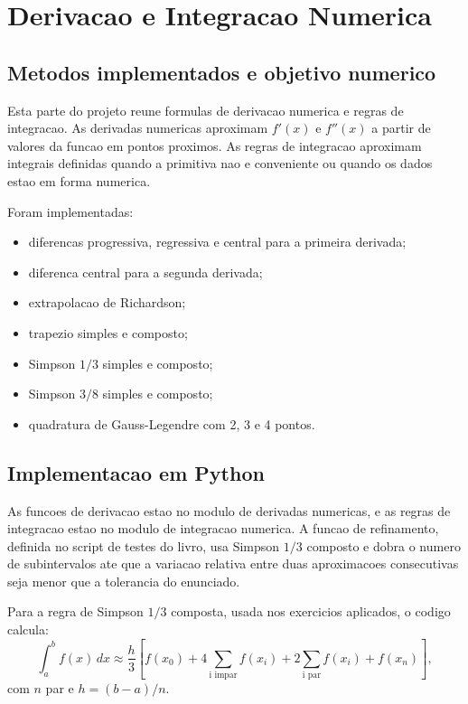 \documentclass[../main.tex]{subfiles}
\begin{document}
\section{Derivacao e Integracao Numerica}

\subsection{Metodos implementados e objetivo numerico}

Esta parte do projeto reune formulas de derivacao numerica e regras de
integracao. As derivadas numericas aproximam \(f'(x)\) e \(f''(x)\) a partir de
valores da funcao em pontos proximos. As regras de integracao aproximam
integrais definidas quando a primitiva nao e conveniente ou quando os dados
estao em forma numerica.

Foram implementadas:

\begin{itemize}
    \item diferencas progressiva, regressiva e central para a primeira
    derivada;
    \item diferenca central para a segunda derivada;
    \item extrapolacao de Richardson;
    \item trapezio simples e composto;
    \item Simpson \(1/3\) simples e composto;
    \item Simpson \(3/8\) simples e composto;
    \item quadratura de Gauss-Legendre com 2, 3 e 4 pontos.
\end{itemize}

\subsection{Implementacao em Python}

As funcoes de derivacao estao no modulo de derivadas numericas, e as regras de
integracao estao no modulo de integracao numerica. A funcao de refinamento,
definida no script de testes do livro, usa Simpson \(1/3\) composto e dobra o
numero de subintervalos ate que a variacao relativa entre duas aproximacoes
consecutivas seja menor que a tolerancia do enunciado.

Para a regra de Simpson \(1/3\) composta, usada nos exercicios aplicados, o
codigo calcula:
\[
    \int_a^b f(x)\,dx \approx \frac{h}{3}
    \left[f(x_0)+4\sum_{\text{i impar}}f(x_i)
    +2\sum_{\text{i par}}f(x_i)+f(x_n)\right],
\]
com \(n\) par e \(h=(b-a)/n\).
\end{document}
